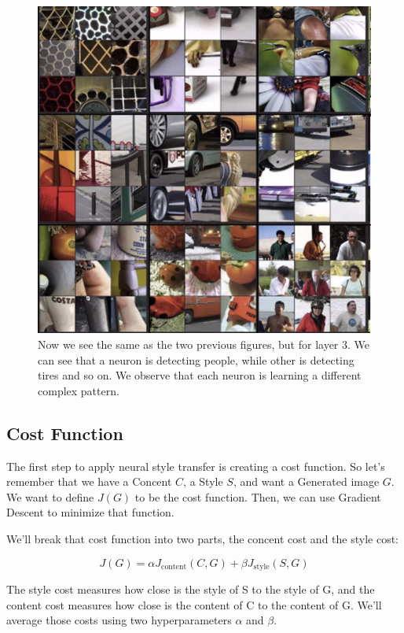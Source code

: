 \documentclass[12pt, a4paper, oneside]{book}
\begin{document}
\begin{figure}[h]
\centering
\includegraphics[scale=0.5]{Res/visualizing_cnn_3.png}
\caption{Now we see the same as the two previous figures, but for layer 3. We
can see that a neuron is detecting people, while other is detecting tires and so
on. We observe that each neuron is learning a different complex pattern.}
\label{visualizing_cnn_3.png}
\end{figure}

\subsection{Cost Function}%
\label{sub:cost_function}

The first step to apply neural style transfer is creating a cost function. So
let's remember that we have a Concent $C$, a Style $S$, and want a Generated
image $G$. We want to define $J(G)$ to be the cost function. Then, we can use
Gradient Descent to minimize that function.

We'll break that cost function into two parts, the concent cost and the style
cost:

\[
J(G)=\alpha J_{\text{content}}(C, G) + \beta J_{\text{style}}(S, G)
\]

The style cost measures how close is the style of S to the style of G, and the
content cost measures how close is the content of C to the content of G. We'll
average those costs using two hyperparameters $\alpha$ and $\beta$.
\end{document}
